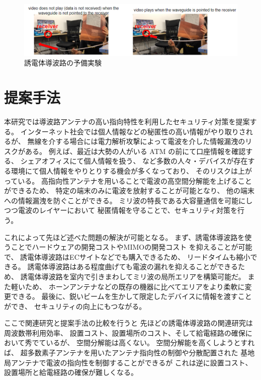 \documentclass[technicalreport]{ieicej}
\begin{document}
\begin{figure}[t]
  \begin{center}
    \includegraphics[bb=0 0 630.087950 152.271255, width=1.0\linewidth]{img/qualitative_experiment.pdf}
    \caption{誘電体導波路の予備実験}
    \label{fig:qualitative_experiment}
  \end{center}
\end{figure}


\section{提案手法}

本研究では導波路アンテナの高い指向特性を利用したセキュリティ対策を提案する。
インターネット社会では個人情報などの秘匿性の高い情報がやり取りされるが、
無線を介する場合には電力解析攻撃によって電波を介した情報漏洩のリスクがある。
例えば、最近は大勢の人がいる ATM の前にて口座情報を確認する、
シェアオフィスにて個人情報を扱う、
など多数の人々・デバイスが存在する環境にて個人情報をやりとりする機会が多くなっており、
そのリスクは上がっている。
高指向性アンテナを用いることで電波の高空間分解能を上げることができるため、
特定の端末のみに電波を放射することが可能となり、
他の端末への情報漏洩を防ぐことができる。
ミリ波の特長である大容量通信を可能にしつつ電波のレイヤーにおいて
秘匿情報を守ることで、セキュリティ対策を行う。

これによって先ほど述べた問題の解決が可能となる。
まず、誘電体導波路を使うことでハードウェアの開発コストやMIMOの開発コスト
を抑えることが可能で、
誘電体導波路はECサイトなどでも購入できるため、
リードタイムも縮小できる。
誘電体導波路はある程度曲げても電波の漏れを抑えることができるため、
誘電体導波路を室内で引きまわしてミリ波の局所エリアを構築可能だ。
また軽いため、
ホーンアンテナなどの既存の機器に比べてエリアをより柔軟に変更できる。
最後に、鋭いビームを生かして限定したデバイスに情報を渡すことができ、
セキュリティの向上にもつながる。


ここで関連研究と提案手法の比較を行うと
先ほどの誘電体導波路の関連研究は周波数帯利用効率、
設置コスト、設置場所のコスト、そして給電経路の確保において秀でているが、
空間分解能は高くない。
空間分解能を高くしようとすれば、
超多数素子アンテナを用いたアンテナ指向性の制御や分散配置された
基地局アンテナで電波の指向性を制御することができるが
これは逆に設置コスト、設置場所と給電経路の確保が難しくなる。
\end{document}

